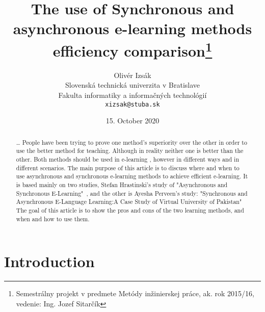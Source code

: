 \documentclass[10pt,twoside,english,a4paper]{article}
\title{The use of Synchronous and asynchronous e-learning methods efficiency comparison\thanks{Semestrálny projekt v predmete Metódy inžinierskej práce, ak. rok 2015/16, vedenie: 	
Ing. Jozef Sitarčík}} %
\author{Olivér Izsák\\[2pt]
	{\small Slovenská technická univerzita v Bratislave}\\
	{\small Fakulta informatiky a informačných technológií}\\
	{\small \texttt{xizsak@stuba.sk}}
	}
\date{\small 15. October 2020}
\begin{document}
\maketitle

\begin{abstract}
\ldots
People have been trying to prove one method's superiority over the other in order to use the better method for teaching.
Although in reality neither one is better than the other. Both methods should be used in e-learning , however
in different ways  and in different scenarios. The main purpose of this article is to discuss  where and when to use asynchronous and
synchronous e-learning methods to achieve efficient e-learning. It is based mainly on two studies, Stefan Hrastinski's study of "Asynchronous and Synchronous E-Learning"~\cite{Hrastinski:E-learning}, and the other is Ayesha Perveen's study: "Synchronous and Asynchronous E-Language Learning:A Case Study of Virtual University of Pakistan"~\cite{Perveen:E-learning}
The goal of this article is to show the pros and cons of the two learning methods, and when and how to use them.
\end{abstract}



\section{Introduction} \label{intro}
\end{document}
